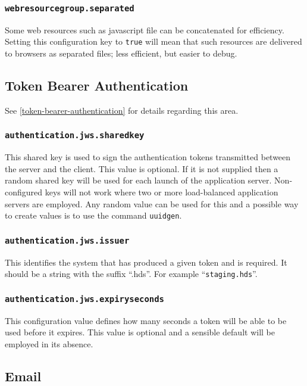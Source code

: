 \subsubsection{\tt webresourcegroup.separated}

Some web resources such as javascript file can be concatenated for efficiency.  Setting this configuration key to {\tt true} will mean that such resources are delivered to browsers as separated files; less efficient, but easier to debug.

\subsection{Token Bearer Authentication}

See \ref{token-bearer-authentication} for details regarding this area.

\subsubsection{\tt authentication.jws.sharedkey}

This shared key is used to sign the authentication tokens transmitted between the server and the client.  This value is optional.  If it is not supplied then a random shared key will be used for each launch of the application server.  Non-configured keys will not work where two or more load-balanced application servers are employed.  Any random value can be used for this and a possible way to create values is to use the command {\tt uuidgen}.

\subsubsection{\tt authentication.jws.issuer}

This identifies the system that has produced a given token and is required.  It should be a string with the suffix ``.hds''.  For example ``{\tt staging.hds}''.

\subsubsection{\tt authentication.jws.expiryseconds}

This configuration value defines how many seconds a token will be able to be used before it expires.  This value is optional and a sensible default will be employed in its absence.

\subsection{Email}

